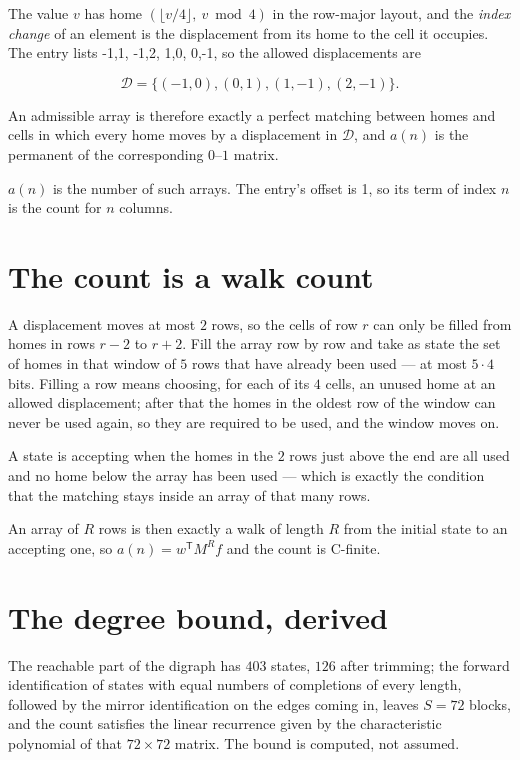 \documentclass[11pt]{article}
\theoremstyle{definition}
\begin{document}
The value $v$ has home $(\lfloor v/4\rfloor,\ v \bmod 4)$ in the row-major layout, and the {\itshape index change} of an element is the displacement from its home to the cell it occupies. The entry lists -1,1, -1,2, 1,0, 0,-1, so the allowed displacements are

\[\mathcal{D} = \{(-1,0), (0,1), (1,-1), (2,-1)\}.\]

An admissible array is therefore exactly a perfect matching between homes and cells in which every home moves by a displacement in $\mathcal{D}$, and $a(n)$ is the permanent of the corresponding $0$--$1$ matrix.

$a(n)$ is the number of such arrays. The entry's offset is 1, so its term of index $n$ is the count for $n$ columns.

\section{The count is a walk count}

A displacement moves at most $2$ rows, so the cells of row $r$ can only be filled from homes in rows $r-2$ to $r+2$. Fill the array row by row and take as state the set of homes in that window of $5$ rows that have already been used --- at most $5\cdot4$ bits. Filling a row means choosing, for each of its $4$ cells, an unused home at an allowed displacement; after that the homes in the oldest row of the window can never be used again, so they are required to be used, and the window moves on.

A state is accepting when the homes in the $2$ rows just above the end are all used and no home below the array has been used --- which is exactly the condition that the matching stays inside an array of that many rows.

An array of $R$ rows is then exactly a walk of length $R$ from the initial state to an accepting one, so $a(n) = w^{\mathsf T}M^{R}f$ and the count is C-finite.

\section{The degree bound, derived}

The reachable part of the digraph has $403$ states, $126$ after trimming; the forward identification of states with equal numbers of completions of every length, followed by the mirror identification on the edges coming in, leaves $S = 72$ blocks, and the count satisfies the linear recurrence given by the characteristic polynomial of that $72\times72$ matrix. The bound is computed, not assumed.
\end{document}
